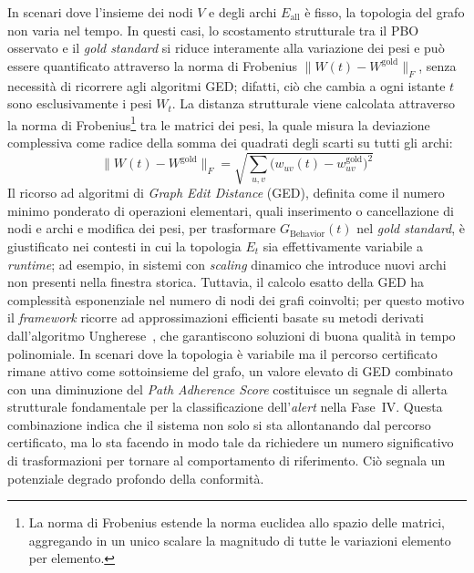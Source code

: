In scenari dove l'insieme dei nodi $V$ e degli archi $E_{\text{all}}$ è fisso, la topologia del
grafo non varia nel tempo. In questi casi, lo scostamento strutturale tra il \gls{PBO} osservato e
il \textit{gold standard} si riduce interamente alla variazione dei pesi e può essere quantificato
attraverso la norma di Frobenius $\|W(t) - W^{\text{gold}}\|_F$, senza necessità di ricorrere agli
algoritmi \gls{GED}; difatti, ciò che cambia a ogni istante $t$ sono esclusivamente i pesi $W_t$.
La distanza strutturale viene calcolata attraverso la norma di
Frobenius\footnote{La norma di Frobenius estende la norma euclidea allo spazio 
delle matrici, aggregando in un unico scalare la magnitudo di tutte le 
variazioni elemento per elemento.} tra le matrici dei pesi, la quale
misura la deviazione complessiva come radice della somma dei quadrati degli scarti su tutti gli
archi:
\begin{equation}
\label{eq:frobenius}
\|W(t) - W^{\text{gold}}\|_F = \sqrt{\sum_{u,v} \bigl(w_{uv}(t) - w^{\text{gold}}_{uv}\bigr)^2}
\end{equation}
Il ricorso ad algoritmi di \textit{Graph Edit Distance} (\gls{GED}), definita come il numero
minimo ponderato di operazioni elementari, quali inserimento o cancellazione di nodi e archi e modifica dei
pesi, per trasformare $G_{\text{Behavior}}(t)$ nel \textit{gold standard}, è giustificato nei
contesti in cui la topologia $E_t$ sia effettivamente variabile a \textit{runtime}; ad esempio,
in sistemi con \textit{scaling} dinamico che introduce nuovi archi non presenti nella finestra
storica. Tuttavia, il calcolo esatto della \gls{GED} ha complessità esponenziale nel numero di
nodi dei grafi coinvolti; per questo motivo il \textit{framework} ricorre ad approssimazioni
efficienti basate su metodi derivati dall'algoritmo Ungherese~\cite{riesen2009}, che garantiscono
soluzioni di buona qualità in tempo polinomiale. In scenari dove la topologia è variabile ma il
percorso certificato rimane attivo come sottoinsieme del grafo, un valore elevato di \gls{GED}
combinato con una diminuzione del \textit{Path Adherence Score} costituisce un segnale di allerta
strutturale fondamentale per la classificazione dell'\textit{alert} nella Fase~IV. Questa
combinazione indica che il sistema non solo si sta allontanando dal percorso certificato, ma lo
sta facendo in modo tale da richiedere un numero significativo di trasformazioni per tornare al
comportamento di riferimento. Ciò segnala un potenziale degrado profondo della conformità.

